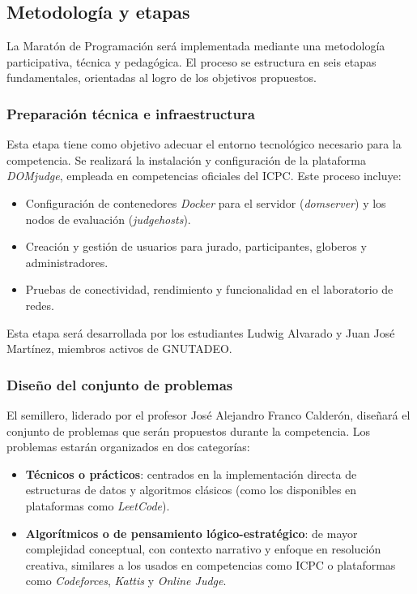 \documentclass{article}
\begin{document}
\subsection{Metodología y etapas}

La Maratón de Programación será implementada mediante una metodología participativa, técnica y pedagógica. El proceso se estructura en seis etapas fundamentales, orientadas al logro de los objetivos propuestos.

\subsubsection{Preparación técnica e infraestructura}

Esta etapa tiene como objetivo adecuar el entorno tecnológico necesario para la competencia. Se realizará la instalación y configuración de la plataforma \textit{DOMjudge}, empleada en competencias oficiales del ICPC. Este proceso incluye:

\begin{itemize}
  \item Configuración de contenedores \textit{Docker} para el servidor (\textit{domserver}) y los nodos de evaluación (\textit{judgehosts})\cite{domjudge-domserver,domjudge-judgehost}.
  \item Creación y gestión de usuarios para jurado, participantes, globeros y administradores.
  \item Pruebas de conectividad, rendimiento y funcionalidad en el laboratorio de redes.
\end{itemize}

Esta etapa será desarrollada por los estudiantes Ludwig Alvarado y Juan José Martínez, miembros activos de GNUTADEO.

\subsubsection{Diseño del conjunto de problemas}

El semillero, liderado por el profesor José Alejandro Franco Calderón, diseñará el conjunto de problemas que serán propuestos durante la competencia. Los problemas estarán organizados en dos categorías:

\begin{itemize}
  \item \textbf{Técnicos o prácticos}: centrados en la implementación directa de estructuras de datos y algoritmos clásicos (como los disponibles en plataformas como \textit{LeetCode}\cite{leetcode}).
  \item \textbf{Algorítmicos o de pensamiento lógico-estratégico}: de mayor complejidad conceptual, con contexto narrativo y enfoque en resolución creativa, similares a los usados en competencias como ICPC o plataformas como \textit{Codeforces}, \textit{Kattis} y \textit{Online Judge}.
\end{itemize}
\end{document}
